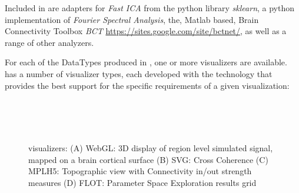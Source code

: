 			Included in \TVB are adapters for \emph{Fast ICA} from the
			python library \emph{sklearn}, a python implementation of
			\emph{Fourier Spectral Analysis}, the, Matlab based, Brain 
			Connectivity Toolbox \emph{BCT}  
			\url{https://sites.google.com/site/bctnet/}, as
			well as a range of other analyzers.

			For each of the DataTypes produced in \TVB, one or more
			visualizers are available. \TVB has a number of visualizer types,
			each developed with the technology that provides the best support 
			for the specific requirements of a given visualization:

			 \begin{figure}[!htbp]
					\\
					\\
					\\
					\caption{\TVB visualizers: 
					(A) WebGL: 3D display of region level simulated signal, mapped on a brain cortical surface
					(B) SVG: Cross Coherence
					(C) MPLH5:  Topographic view with Connectivity in/out strength measures
					(D) FLOT: Parameter Space Exploration results grid}
				\label{fig:visualizers}
			\end{figure}
	
